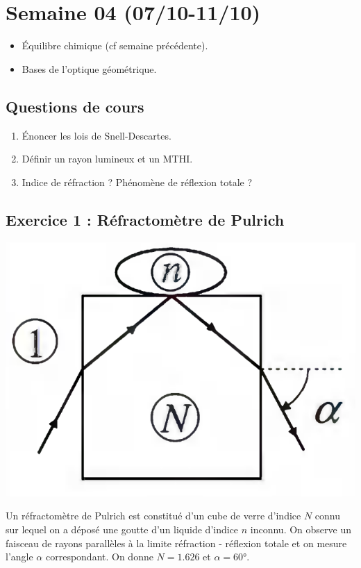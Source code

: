 \section{Semaine 04 (07/10-11/10) }


\begin{itemize}
	\item Équilibre chimique (cf semaine précédente).
	\item Bases de l'optique géométrique.
\end{itemize}

\subsection{Questions de cours}
\begin{enumerate}
	\item Énoncer les lois de Snell-Descartes.
	\item Définir un rayon lumineux et un MTHI.
	\item Indice de réfraction ? Phénomène de réflexion totale ?
\end{enumerate}

\subsection{Exercice 1 : Réfractomètre de Pulrich}

\begin{minipage}[c]{\linewidth/2}
	\includegraphics[width=\linewidth]{Images/mpsi_s04_ex01.png}
\end{minipage}%
\begin{minipage}[c]{\linewidth/2}
	Un réfractomètre de Pulrich est constitué d'un cube de verre d'indice $N$ connu sur lequel on a déposé une goutte d'un liquide d'indice $n$ inconnu. On observe un faisceau de rayons parallèles à la limite réfraction - réflexion totale et on mesure l'angle $\alpha$ correspondant. On donne $N=1.626$ et $\alpha=60$°.
\end{minipage} 

